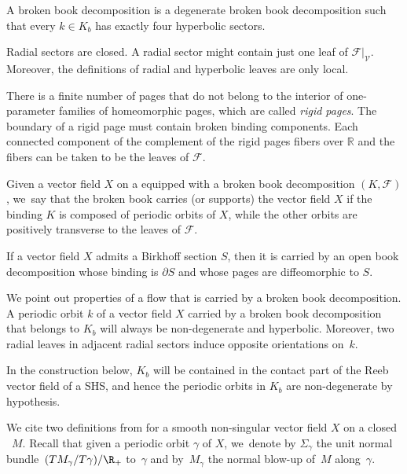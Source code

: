 \begin{defi}\label{defn:BBD2}
A broken book decomposition is a degenerate broken book decomposition such that every $k\in K_b$ has exactly four hyperbolic sectors.
\end{defi}

\begin{Remark}
Radial sectors are closed. A radial sector might contain just one leaf of $\mathcal{F}|_{\mathcal{V}}$. Moreover, the definitions of radial and hyperbolic leaves are only local.
\end{Remark}

There is a finite number of pages that do not belong to the interior of one-parameter families of homeomorphic pages, which are called \emph{rigid pages}. The boundary of a rigid page must contain broken binding components. Each connected component of the complement of the rigid pages fibers over $\mathbb{R}$ and the fibers can be taken to be the leaves of $\mathcal{F}$.

\begin{defi}
Given a vector field $X$ on a \threemanifold equipped with a broken book decomposition $(K,\mathcal{F})$, we~say that the broken book carries (or supports) the vector field $X$ if the binding $K$ is composed of periodic orbits of $X$, while the other orbits are positively transverse to the leaves of $\mathcal{F}$.
\end{defi}

If a vector field $X$ admits a Birkhoff section $S$, then it is carried by an open book decomposition whose binding is $\partial S$ and whose pages are diffeomorphic to $S$.

\begin{Remark}\label{rem:orientation}
We point out properties of a flow that is carried by a broken book decomposition. A periodic orbit $k$ of a vector field $X$ carried by a broken book decomposition that belongs to $K_b$ will always be non-degenerate and hyperbolic. Moreover, two radial leaves in adjacent radial sectors induce opposite orientations on~$k$.
\end{Remark}

In the construction below, $K_b$ will be contained in the contact part of the Reeb vector field of a SHS, and hence the periodic orbits in $K_b$ are non-degenerate by hypothesis.

We cite two definitions from \cite{CDR} for a smooth non-singular vector field $X$ on a closed \threemanifold~$M$. Recall that given a periodic orbit $\gamma$ of $X$, we~denote by $\Sigma_\gamma$ the unit normal bundle~$(TM_\gamma/T\gamma)/\R_+$ to~$\gamma$ and by~$M_\gamma$ the normal blow-up of~$M$ along~$\gamma$.

